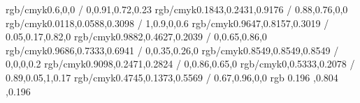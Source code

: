 \newcommand{\targetcolourmodel}{cmyk} %
\selectcolormodel{\targetcolourmodel}

\definecolor{dtured}    {rgb/cmyk}{0.6,0,0 / 0,0.91,0.72,0.23}
\definecolor{blue}      {rgb/cmyk}{0.1843,0.2431,0.9176 / 0.88,0.76,0,0}
\definecolor{navyblue}  {rgb/cmyk}{0.0118,0.0588,0.3098 / 1,0.9,0,0.6}
\definecolor{yellow}    {rgb/cmyk}{0.9647,0.8157,0.3019 / 0.05,0.17,0.82,0}
\definecolor{orange}    {rgb/cmyk}{0.9882,0.4627,0.2039 / 0,0.65,0.86,0}
\definecolor{pink}      {rgb/cmyk}{0.9686,0.7333,0.6941 / 0,0.35,0.26,0}
\definecolor{grey}      {rgb/cmyk}{0.8549,0.8549,0.8549 / 0,0,0,0.2}
\definecolor{red}       {rgb/cmyk}{0.9098,0.2471,0.2824 / 0,0.86,0.65,0}
\definecolor{green}     {rgb/cmyk}{0,0.5333,0.2078 / 0.89,0.05,1,0.17}
\definecolor{purple}    {rgb/cmyk}{0.4745,0.1373,0.5569 / 0.67,0.96,0,0}
\definecolor{limegreen} {rgb}     {0.196 ,0.804 ,0.196}
\newcommand{\dtulogocolour}{white} %
\newcommand{\frontpagetextcolour}{white} %



